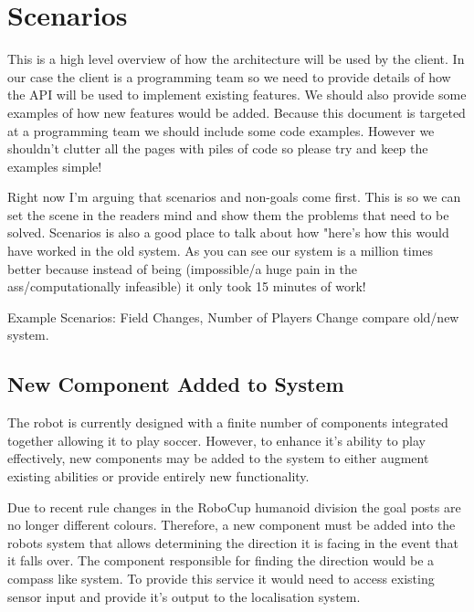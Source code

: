 \documentclass[english,12pt]{scrartcl}
\begin{document}
    \section{Scenarios}
        This is a high level overview of how the architecture will be used by the client. In our
        case the client is a programming team so we need to provide details of how the API will be
        used to implement existing features. We should also provide some examples of how new 
        features would be added. Because this document is targeted at a programming team we should
        include some code examples. However we shouldn't clutter all the pages with piles of code so 
        please try and keep the examples simple!

        Right now I'm arguing that scenarios and non-goals come first. This is so we can set the
        scene in the readers mind and show them the problems that need to be solved. Scenarios is
        also a good place to talk about how "here's how this would have worked in the old system. As
        you can see our system is a million times better because instead of being (impossible/a huge 
        pain in the ass/computationally infeasible) it only took 15 minutes of work!

        Example Scenarios: Field Changes, Number of Players Change compare old/new system.
        
        \subsection{New Component Added to System}
            The robot is currently designed with a finite number of components integrated together
            allowing it to play soccer. However, to enhance it's ability to play effectively, new
            components may be added to the system to either augment existing abilities or provide
            entirely new functionality.
            
            Due to recent rule changes in the RoboCup humanoid division
            \cite[Section 1.2]{humanoid2013rules} the goal posts are no longer different colours.
            Therefore, a new component must be added into the robots system that allows determining 
            the direction it is facing in the event that it falls over. The component responsible
            for finding the direction would be a compass like system. To provide this service it
            would need to access existing sensor input and provide it's output to the localisation
            system.
    
\end{document}
